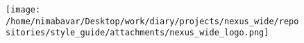 \documentclass{scrarticle}
\begin{document}
    \begin{figure}[h!]

        \texttt{[image: /home/nimabavar/Desktop/work/diary/projects/nexus\_wide/repositories/style\_guide/attachments/nexus\_wide\_logo.png]}

    \end{figure}
\end{document}
